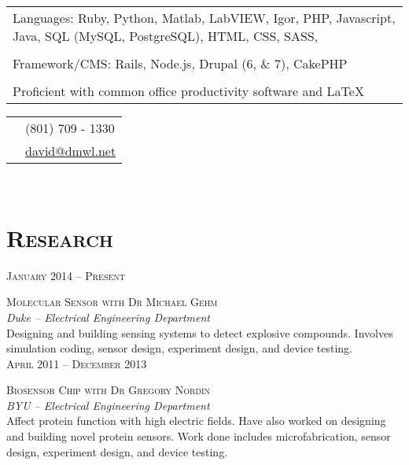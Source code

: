 \documentclass[10pt]{article}
\begin{document}
{\begin{minipage}[t]{0.5\textwidth}
	\begin{tabular}{p{8cm}}
      Languages: Ruby, Python, Matlab, LabVIEW, Igor, PHP, Javascript, Java, SQL (MySQL, PostgreSQL), HTML, CSS, SASS, \\\\
    Framework/CMS: Rails, Node.js, Drupal (6, \& 7), CakePHP\\\\
    Proficient with common office productivity software and \LaTeX{}\\
	\end{tabular}
	
\end{minipage} %
\hfill
\begin{minipage}[t]{0.44\textwidth} %
	
	\vspace{0pt} %
	
\colorbox{shade}{\textcolor{text1}{
	\begin{tabular}{c|p{7cm}}
		\raisebox{-3pt}{\Phone}  		&(801) 709 - 1330\\
		\raisebox{-3pt}{\Envelope} 	&\href{mailto:david@dmwl.net}
								{david@dmwl.net}
	\end{tabular}
	}
}\\[10pt]

\section{\textsc{Research}}

	\raggedleft
	\textsc{\normalsize January 2014 -- Present}\par

	\raggedright\large \textsc{Molecular Sensor with Dr Michael Gehm }\\
  \emph{Duke -- Electrical Engineering Department}\\[5pt]
  \normalsize{%
    Designing and building sensing systems to detect explosive compounds.
    Involves simulation coding, sensor design, experiment design, and device testing.
  }\\[10pt]

	\raggedleft
	\textsc{\normalsize April 2011 -- December 2013}\par

	\raggedright\large \textsc{Biosensor Chip with Dr Gregory Nordin}\\
  \emph{BYU -- Electrical Engineering Department}\\[5pt]
  \normalsize{%
    Affect protein function with high electric fields.
    Have also worked on designing and building novel protein sensors.
    Work done includes microfabrication, sensor design, experiment design, and device testing.
  }\\[10pt]


\end{minipage}}
\end{document}
